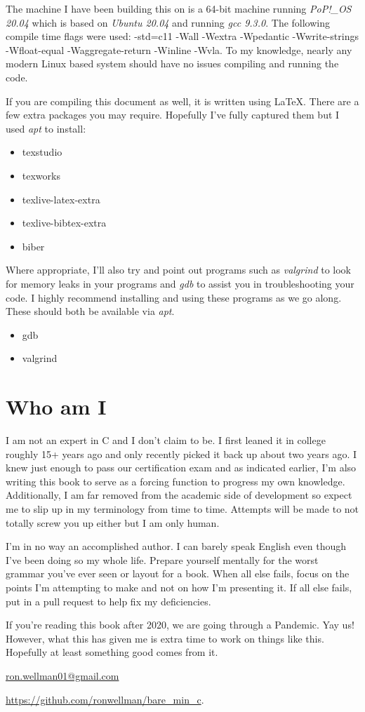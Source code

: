 \documentclass[../main.tex]{subfiles}
\begin{document}
The machine I have been building this on is a 64-bit machine running \emph{PoP!\_OS 20.04} which is based on \emph{Ubuntu 20.04} and running \emph{gcc 9.3.0}. The following compile time flags were used: -std=c11 -Wall -Wextra -Wpedantic -Wwrite-strings -Wfloat-equal -Waggregate-return -Winline -Wvla. To my knowledge, nearly any modern Linux based system should have no issues compiling and running the code.  

If you are compiling this document as well, it is written using \LaTeX.  There are a few extra packages you may require.  Hopefully I've fully captured them but I used \textit{apt} to install:
\begin{itemize}
	\item texstudio
	\item texworks
	\item texlive-latex-extra
	\item texlive-bibtex-extra
	\item biber
\end{itemize}

Where appropriate, I'll also try and point out programs such as \textit{valgrind} to look for memory leaks in your programs and \textit{gdb} to assist you in troubleshooting your code. I highly recommend installing and using these programs as we go along.  These should both be available via \textit{apt}.
\begin{itemize}
	\item gdb
	\item valgrind
\end{itemize}

\section{Who am I}
I am not an expert in C and I don't claim to be.  I first leaned it in college roughly 15+ years ago and only recently picked it back up about two years ago.  I knew just enough to pass our certification exam and as indicated earlier, I'm also writing this book to serve as a forcing function to progress my own knowledge.  Additionally, I am far removed from the academic side of development so expect me to slip up in my terminology from time to time.  Attempts will be made to not totally screw you up either but I am only human.

I'm in no way an accomplished author.  I can barely speak English even though I've been doing so my whole life.  Prepare yourself mentally for the worst grammar you've ever seen or layout for a book.  When all else fails, focus on the points I'm attempting to make and not on how I'm presenting it.  If all else fails, put in a pull request to help fix my deficiencies.

If you're reading this book after 2020, we are going through a Pandemic.  Yay us!  However, what this has given me is extra time to work on things like this.  Hopefully at least something good comes from it.

\href{mailto:ron.wellman01@gmail.com}{ron.wellman01@gmail.com}

\href{https://github.com/ronwellman/bare_min_c}{https://github.com/ronwellman/bare\_min\_c}.

\mainmatter
\end{document}
